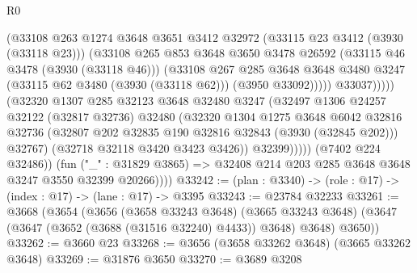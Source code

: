 \begin{lexlean}{R0}
\begin{coremodule}
                                (@33108
                                  @263
                                  @1274
                                  @3648
                                  @3651
                                  @3412
                                  @32972
                                  (@33115 @23 @3412 (@3930 (@33118 @23)))
                                  (@33108
                                    @265
                                    @853
                                    @3648
                                    @3650
                                    @3478
                                    @26592
                                    (@33115 @46 @3478 (@3930 (@33118 @46)))
                                    (@33108
                                      @267
                                      @285
                                      @3648
                                      @3648
                                      @3480
                                      @3247
                                      (@33115 @62 @3480 (@3930 (@33118 @62)))
                                      (@3950 @33092)))))
                              @33037)))))
                    (@32320
                      @1307
                      @285
                      @32123
                      @3648
                      @32480
                      @3247
                      (@32497
                        @1306
                        @24257
                        @32122
                        (@32817 @32736)
                        @32480
                        (@32320
                          @1304
                          @1275
                          @3648
                          @6042
                          @32816
                          @32736
                          (@32807 @202 @32835 @190 @32816 @32843 (@3930 (@32845 @202)))
                          @32767)
                        (@32718 @32118 @3420 @3423 @3426))
                      @32399)))))
            (@7402 @224 @32486))
          (fun ("_" : @31829 @3865) =>
          @32408 @214 @203 @285 @3648 @3648 @3247 @3550 @32399 @20266))))
@33242 := (plan : @3340) -> (role : @17) -> (index : @17) -> (lane : @17) -> @3395
@33243 := @23784 @32233
@33261 := @3668
    (@3654
      (@3656
        (@3658 @33243 @3648)
        (@3665 @33243 @3648)
        (@3647 (@3647 (@3652 (@3688 (@31516 @32240) @4433)) @3648) @3648)
        @3650))
@33262 := @3660 @23
@33268 := @3656 (@3658 @33262 @3648) (@3665 @33262 @3648)
@33269 := @31876 @3650
@33270 := @3689 @3208

\end{coremodule}
\end{lexlean}
